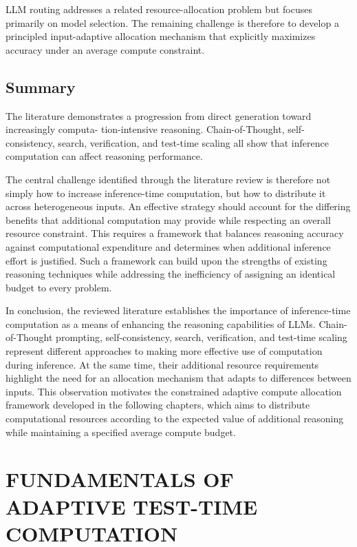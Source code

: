 \documentclass[12pt,a4paper,titlepage]{report}
\begin{document}
LLM routing addresses a related resource-allocation problem but focuses primarily on model selection. The remaining challenge is therefore to develop a principled input-adaptive allocation mechanism that explicitly maximizes accuracy under an average compute constraint.

\section{Summary}

The literature demonstrates a progression from direct generation toward increasingly computa- tion-intensive reasoning. Chain-of-Thought, self-consistency, search, verification, and test-time scaling all show that inference computation can affect reasoning performance.

The central challenge identified through the literature review is therefore not simply how to increase inference-time computation, but how to distribute it across heterogeneous inputs. An effective strategy should account for the differing benefits that additional computation may provide while respecting an overall resource constraint. This requires a framework that balances reasoning accuracy against computational expenditure and determines when additional inference effort is justified. Such a framework can build upon the strengths of existing reasoning techniques while addressing the inefficiency of assigning an identical budget to every problem.

In conclusion, the reviewed literature establishes the importance of inference-time computation as a means of enhancing the reasoning capabilities of LLMs. Chain-of-Thought prompting, self-consistency, search, verification, and test-time scaling represent different approaches to making more effective use of computation during inference. At the same time, their additional resource requirements highlight the need for an allocation mechanism that adapts to differences between inputs. This observation motivates the constrained adaptive compute allocation framework developed in the following chapters, which aims to distribute computational resources according to the expected value of additional reasoning while maintaining a specified average compute budget.


\chapter{FUNDAMENTALS OF ADAPTIVE TEST-TIME COMPUTATION}
\end{document}
